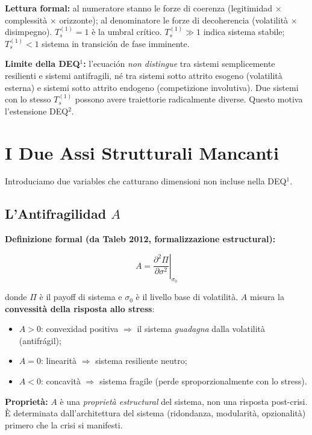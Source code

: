 \Proved{} \textbf{Lettura formal:} al numeratore stanno le forze di
coerenza (legitimidad $\times$ complessità $\times$ orizzonte); al denominatore le
forze di decoherencia (volatilità $\times$ disimpegno). \(T_s^{(1)} = 1\) è la
umbral crítico. \(T_s^{(1)} \gg 1\) indica sistema stabile;
\(T_s^{(1)} < 1\) sistema in transición de fase imminente.

\Conj{} \textbf{Limite della DEQ$^1$:} l'ecuación \emph{non distingue} tra
sistemi semplicemente resilienti e sistemi antifragili, né tra sistemi
sotto attrito esogeno (volatilità esterna) e sistemi sotto attrito
endogeno (competizione involutiva). Due sistemi con lo stesso
\(T_s^{(1)}\) possono avere traiettorie radicalmente diverse. Questo
motiva l'estensione DEQ$^2$.



\section{I Due Assi Strutturali
Mancanti}\label{i-due-assi-strutturali-mancanti}

Introduciamo due variables che catturano dimensioni non incluse nella
DEQ$^1$.

\subsection{\texorpdfstring{L'Antifragilidad
\(A\)}{L'Antifragilidad A}}\label{lantifragilituxe0-a}

\Proved{} \textbf{Definizione formal (da Taleb 2012, formalizzazione
estructural):}

\[
A = \left.\frac{\partial^2 \Pi}{\partial \sigma^2}\right|_{\sigma_0}
\]

donde \(\Pi\) è il payoff di sistema e \(\sigma_0\) è il livello base di
volatilità. \(A\) misura la \textbf{convessità della risposta allo
stress}:

\begin{itemize}
\tightlist
\item
  \(A > 0\): convexidad positiva $\Rightarrow$ il sistema \emph{guadagna} dalla
  volatilità (antifrágil);
\item
  \(A = 0\): linearità $\Rightarrow$ sistema resiliente neutro;
\item
  \(A < 0\): concavità $\Rightarrow$ sistema fragile (perde sproporzionalmente con
  lo stress).
\end{itemize}

\Hypoth{} \textbf{Proprietà:} \(A\) è una \emph{proprietà estructural}
del sistema, non una risposta post-crisi. È determinata
dall'architettura del sistema (ridondanza, modularità, opzionalità)
primero che la crisi si manifesti.

